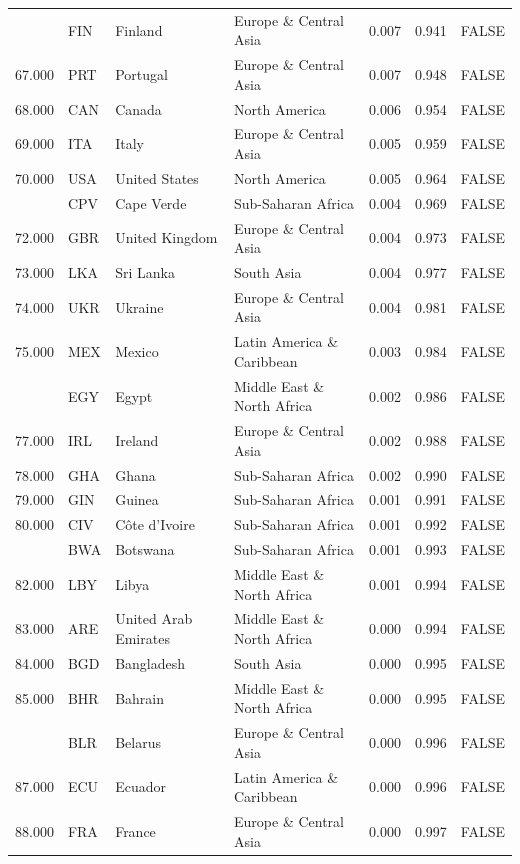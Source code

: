 \begin{table}
\begin{tabular}[t]{lllllll}
\addlinespace
66.000 & FIN & Finland & Europe \& Central Asia & 0.007 & 0.941 & FALSE\\
67.000 & PRT & Portugal & Europe \& Central Asia & 0.007 & 0.948 & FALSE\\
68.000 & CAN & Canada & North America & 0.006 & 0.954 & FALSE\\
69.000 & ITA & Italy & Europe \& Central Asia & 0.005 & 0.959 & FALSE\\
70.000 & USA & United States & North America & 0.005 & 0.964 & FALSE\\
\addlinespace
71.000 & CPV & Cape Verde & Sub-Saharan Africa & 0.004 & 0.969 & FALSE\\
72.000 & GBR & United Kingdom & Europe \& Central Asia & 0.004 & 0.973 & FALSE\\
73.000 & LKA & Sri Lanka & South Asia & 0.004 & 0.977 & FALSE\\
74.000 & UKR & Ukraine & Europe \& Central Asia & 0.004 & 0.981 & FALSE\\
75.000 & MEX & Mexico & Latin America \& Caribbean & 0.003 & 0.984 & FALSE\\
\addlinespace
76.000 & EGY & Egypt & Middle East \& North Africa & 0.002 & 0.986 & FALSE\\
77.000 & IRL & Ireland & Europe \& Central Asia & 0.002 & 0.988 & FALSE\\
78.000 & GHA & Ghana & Sub-Saharan Africa & 0.002 & 0.990 & FALSE\\
79.000 & GIN & Guinea & Sub-Saharan Africa & 0.001 & 0.991 & FALSE\\
80.000 & CIV & Côte d’Ivoire & Sub-Saharan Africa & 0.001 & 0.992 & FALSE\\
\addlinespace
81.000 & BWA & Botswana & Sub-Saharan Africa & 0.001 & 0.993 & FALSE\\
82.000 & LBY & Libya & Middle East \& North Africa & 0.001 & 0.994 & FALSE\\
83.000 & ARE & United Arab Emirates & Middle East \& North Africa & 0.000 & 0.994 & FALSE\\
84.000 & BGD & Bangladesh & South Asia & 0.000 & 0.995 & FALSE\\
85.000 & BHR & Bahrain & Middle East \& North Africa & 0.000 & 0.995 & FALSE\\
\addlinespace
86.000 & BLR & Belarus & Europe \& Central Asia & 0.000 & 0.996 & FALSE\\
87.000 & ECU & Ecuador & Latin America \& Caribbean & 0.000 & 0.996 & FALSE\\
88.000 & FRA & France & Europe \& Central Asia & 0.000 & 0.997 & FALSE\\

\end{tabular}
\end{table}
